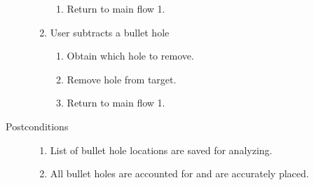 \begin{description}
\begin{enumerate}
\begin{enumerate}
                    \item Return to main flow 1.
                \end{enumerate}
            \item User subtracts a bullet hole
                \begin{enumerate}
                    \item Obtain which hole to remove.
                    \item Remove hole from target.
                    \item Return to main flow 1.
                \end{enumerate}
        \end{enumerate}
    \item[Postconditions]
        \begin{enumerate}
            \item List of bullet hole locations are saved for analyzing.
            \item All bullet holes are accounted for and are accurately placed.
        \end{enumerate}
\end{description}
\myspace


